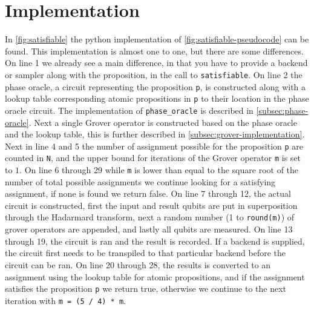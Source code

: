 \section{Implementation}\label{sec:implementation}

In \autoref{fig:satisfiable} the python implementation of \autoref{fig:satisfiable-pseudocode} can be found.
This implementation is almost one to one, but there are some differences.
On line 1 we already see a main difference, in that you have to provide a backend or sampler along with the proposition, in the call to \texttt{satisfiable}.
On line 2 the phase oracle, a circuit representing the proposition \texttt{p}, is constructed along with a lookup table corresponding atomic propositions in \texttt{p} to their location in the phase oracle circuit.
The implementation of \texttt{phase\_oracle} is described in \autoref{subsec:phase-oracle}.
Next a single Grover operator is constructed based on the phase oracle and the lookup table, this is further described in \autoref{subsec:grover-implementation}.
Next in line 4 and 5 the number of assignment possible for the proposition \texttt{p} are counted in \texttt{N}, and the upper bound for iterations of the Grover operator \texttt{m} is set to $1$.
On line 6 through 29 while \texttt{m} is lower than equal to the square root of the number of total possible assignments we continue looking for a satisfying assignment, if none is found we return false.
On line 7 through 12, the actual circuit is constructed, first the input and result qubits are put in superposition through the Hadarmard transform, next a random number (1 to \texttt{round(m)}) of grover operators are appended, and lastly all qubits are measured.
On line 13 through 19, the circuit is ran and the result is recorded.
If a backend is supplied, the circuit first needs to be transpiled to that particular backend before the circuit can be ran.
On line 20 through 28, the results is converted to an assignment using the lookup table for atomic propositions, and if the assignment satisfies the proposition \texttt{p} we return true, otherwise we continue to the next iteration with \texttt{m = (5 / 4) * m}.

